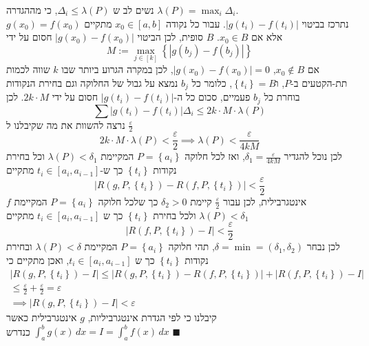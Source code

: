 \documentclass[12pt, titlepage]{article}
\begin{document}
נשים לב ש $\Delta_{i}\leq\lambda \left( P \right)$, כי מההגדרה $\lambda \left( P \right)=\max_{i}\Delta _i$.\\
נתרכז בביטוי $\left| g\left( t_{i} \right)-f\left( t_{i} \right) \right|$. עבור כל נקודה $x_{0}\in \left[ a,b \right]$ מתקיים $g\left( x_{0} \right)=f\left( x_{0} \right)$ אלא אם $x_{0}\in B$. $B$ סופית, לכן הביטוי $\left| g\left( x_{0} \right)-f\left( x_{0} \right) \right|$ חסום על ידי 
$$
M:=\max_{j\in \left[ k \right]}\left\{ \left|g\left( b_{j} \right)-f\left( b_{j} \right)  \right| \right\}
$$
אם $x_{0}\not\in B$, $\left| g\left( x_{0} \right)-f\left( x_{0} \right) \right|=0$, לכן במקרה הגרוע ביותר שבו $k$ שווה לכמות תת-הקטעים ב-$P$, ו$\left\{ t_{i} \right\}=B$, כלומר כל $b_{j}$ נמצא על גבול של החלוקה וגם בחירת הנקודות בוחרת כל $b_{j}$ פעמיים, סכום כל ה-$\left| g\left( t_{i} \right)-f\left( t_{i} \right) \right|$ חסום על ידי $2k\cdot M$. לכן
$$
	\sum \left| g\left( t_{i} \right) -f\left( t_{i} \right)  \right| \Delta_{i}\leq 2k\cdot M\cdot\lambda \left( P \right) 
$$
נרצה להשוות את מה שקיבלנו ל $\frac{\varepsilon}{2}$
$$
	2k\cdot M\cdot\lambda \left( P \right) < \frac{\varepsilon}{2}\implies \lambda \left( P \right) < \frac{\varepsilon}{4kM}
$$
לכן נוכל להגדיר $\delta_{1}= \frac{\varepsilon}{4kM}$, ואז לכל חלוקה $P=\left\{ a_{i} \right\}$ המקיימת $\lambda \left( P \right)<\delta_{1}$ וכל בחירת נקודות $\left\{ t_{i} \right\}$ כך ש-$t_{i}\in \left[ a_{i},a_{i-1} \right]$ מתקיים
$$
	\left| R\left(g, P,\left\{t_i\right\}\right) - R\left(f, P,\left\{t_i\right\}\right) \right|  < \frac{\varepsilon}{2}
$$
$f$ אינטגרבילית, לכן עבור $\frac{\varepsilon}{2}$ קיימת $\delta_{2}>0$ כך שלכל חלוקה $P=\left\{ a_{i} \right\}$ המקיימת $\lambda \left( P \right)<\delta_{1}$ ולכל בחירת $\left\{ t_{i} \right\}$ כך ש $t_{i}\in \left[ a_{i},a_{i-1} \right]$ מתקיים
$$
	\left| R\left( f,P,\left\{ t_{i} \right\}  \right)-I  \right|< \frac{\varepsilon}{2}
$$
לכן נבחר $\delta=\min=\left( \delta_{1},\delta_{2} \right)$, תהי חלוקה $P=\left\{ a_{i} \right\}$ המקיימת $\lambda \left( P \right)<\delta$ ובחירת נקודות $\left\{ t_{i} \right\}$ כך ש $t_{i}\in \left[ a_{i},a_{i-1} \right]$, ואכן מתקיים כי
\begin{gather*}
		\left| R\left( g,P,\left\{ t_{i} \right\}  \right)-I  \right| \leq\left| R\left( g,P,\left\{ t_{i} \right\}\right)  -R\left( f,P,\left\{ t_{i} \right\}   \right)  \right| + \left| R\left( f,P,\left\{ t_{i} \right\}  \right) -I \right| \\
		  \leq \frac{\varepsilon}{2} + \frac{\varepsilon}{2} = \varepsilon \\
		  \implies \left| R\left(g, P,\left\{t_i\right\}\right) -I \right| <\varepsilon
\end{gather*}
קיבלנו כי  לפי הגדרת אינטגרביליות, $g$ אינטגרבילית כאשר $\int_{a}^{b} g\left( x \right) \, dx=I=\int_{a}^{b} f\left( x \right) \, dx$ כנדרש
$\blacksquare$
\end{document}

